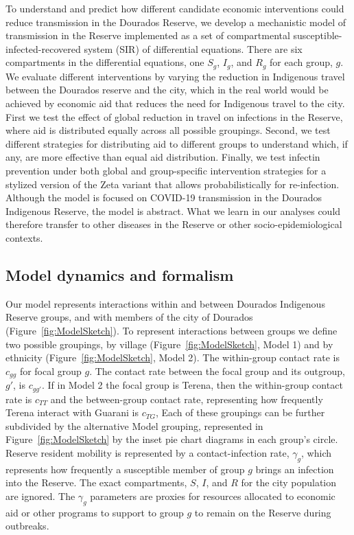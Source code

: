 \documentclass[
  letterpaper,
  abstract]{scrartcl}
\begin{document}
To understand and predict how different candidate economic interventions could
reduce transmission in the Dourados Reserve, we develop a mechanistic model of
transmission in the Reserve implemented as a set of compartmental
susceptible-infected-recovered system (SIR) of differential equations.  There
are six compartments in the differential equations, one $S_g$, $I_g$, and $R_g$ for
each group, $g$.  We evaluate different interventions by varying the reduction in
Indigenous travel between the Dourados reserve and the city, which in the real
world would be achieved by economic aid that reduces the need for Indigenous
travel to the city. First we test the effect of global reduction in travel on
infections in the Reserve, where aid is distributed equally across all possible
groupings. Second, we test different strategies for distributing aid to
different groups to understand which, if any, are more effective than equal aid
distribution. Finally, we test infectin prevention under both global and
group-specific intervention strategies for a stylized version of the Zeta
variant that allows probabilistically for re-infection. Although the model is
focused on COVID-19 transmission in the Dourados Indigenous Reserve, the
model is abstract. What we learn in our analyses could therefore transfer to
other diseases in the Reserve or other socio-epidemiological contexts.


\subsection{Model dynamics and formalism}
\label{sub:modelDynamics}

Our model represents interactions within and between Dourados Indigenous 
Reserve groups, and with members of the city of Dourados 
(Figure~\ref{fig:ModelSketch}). To represent
interactions between groups we define two possible groupings, by village
(Figure~\ref{fig:ModelSketch}, Model 1) and by ethnicity
(Figure~\ref{fig:ModelSketch}, Model 2). The within-group contact rate 
is $c_{gg}$ for focal group $g$. The contact rate between the focal group and
its outgroup, $g'$, is $c_{gg'}$. If in Model 2 the focal group is Terena, then
the within-group contact rate is $c_{TT}$ and the between-group contact rate,
representing how frequently Terena interact with Guarani is $c_{TG}$, Each of these groupings can be further
subdivided by the alternative Model grouping, represented in 
Figure~\ref{fig:ModelSketch} by the inset pie chart diagrams in each group's
circle. Reserve resident mobility is represented by a contact-infection rate,
$\gamma_g$, which represents how frequently a susceptible member of group $g$
brings an infection into the Reserve. The exact compartments, $S$, $I$, and $R$
for the city population are ignored.
The $\gamma_g$ parameters are proxies for resources allocated to 
economic aid or other programs to support to group $g$ to remain on the Reserve 
during outbreaks. 
\end{document}
